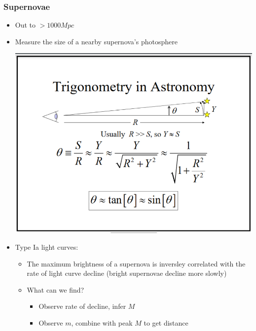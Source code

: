 \documentclass{book}
\begin{document}
\subsubsection{Supernovae}
\begin{itemize}
    \item Out to $> 1000 Mpc$
    \item Measure the size of a nearby supernova's photosphere

          \begin{center}
              \includegraphics[height=0.5\textwidth]{images/trig_astro.png}
          \end{center}

    \item Type Ia light curves:
          \begin{itemize}
              \item The maximum brightness of a supernova is inversley correlated with the rate of light curve decline (bright supernovae decline more slowly)
              \item What can we find?
                    \begin{itemize}
                        \item Observe rate of decline, infer $M$
                        \item Observe $m$, combine with peak $M$ to get distance
                    \end{itemize}
          \end{itemize}
\end{itemize}
\end{document}
